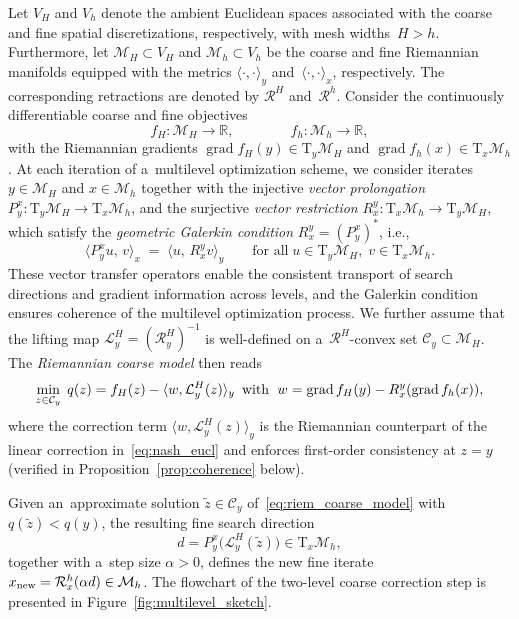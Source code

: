\documentclass[11pt,reqno]{amsart}
\theoremstyle{plain}
\newcommand\R{\mathbb R}
\DeclareMathOperator{\grad}{grad}
\newcommand\calC{\mathcal C}
\newcommand{\M}{\mathcal{M}}
\newcommand{\Tan}{\mathrm{T}}
\newcommand{\Ret}{\mathcal R}
\newcommand{\invRet}{\mathcal L}
\begin{document}
	Let $V_H$ and $V_h$ denote the ambient Euclidean spaces associated with the coarse and fine spatial discretizations, respectively, with mesh widths~$H>h$. Furthermore, let $\M_H\subset V_H$ and $\M_h\subset V_h$ be the coarse and fine Riemannian manifolds equipped with the metrics $\langle\cdot,\cdot\rangle_y$ and~$\langle\cdot,\cdot\rangle_x$, respectively. The corresponding retractions are denoted by $\Ret^H$ and~$\Ret^h$. Consider the continuously differentiable coarse and fine objectives
	\[
	f_H \colon \M_H \to  \R, \qquad\qquad f_h\colon\M_h \to \R,
	\]
	with the Riemannian gradients $\grad f_H(y)\in \Tan_{y} \M_H$ and $\grad f_h(x)\in\Tan_{x} \M_h$. At each
	iteration of a~multilevel optimization scheme, we consider iterates
	$y \in \M_H$ and $x \in \M_h$ together with the injective \emph{vector
		prolongation} $P_{y}^{x} \colon \Tan_{y} \M_H \to \Tan_{x} \M_h$,
	and the surjective \emph{vector restriction} $R_{x}^{y} \colon \Tan_{x} \M_h \to \Tan_{y} \M_H$, which satisfy the \emph{geometric Galerkin condition} $R_{x}^{y} = (P_{y}^{x})^\ast$, i.e.,\
	\begin{equation}\label{eq:riem_galerkin}
		\langle P_{y}^{x} u,\, v\rangle_{x} \;=\; \langle u,\, R_{x}^{y} v\rangle_{y}
		\qquad \text{for all}\;u \in \Tan_{y} \M_H,\;v\in \Tan_{x} \M_h.
	\end{equation}
	These vector transfer operators enable the consistent transport of search
	directions and gradient information across levels, and the Galerkin
	condition ensures coherence of the multilevel optimization process.
	We further assume that the lifting map $\invRet_{y}^H=(\Ret_{y}^H)^{-1}$ is
	well-defined on a~$\Ret^H$-convex set $\calC_{y}\subset \M_H$. The
	\emph{Riemannian coarse model} then reads
	\begin{equation} \label{eq:riem_coarse_model}
		\min\limits_{z \in \calC_{y}} \; q(z) = f_H(z) - \langle w, \invRet^H_{y}(z)\rangle_{y}
		\enskip \text{with }\; w = \grad f_H(y) - R_{x}^{y}(\grad f_h(x)),
	\end{equation}
	where the correction term $\langle w, \invRet^H_{y}(z)\rangle_{y}$ is the
	Riemannian counterpart of the linear correction in~\eqref{eq:nash_eucl}
	and enforces first-order consistency at $z = y$
	(verified in Proposition~\ref{prop:coherence} below).
	
	Given an~approximate solution $\tilde{z}\in\calC_y$ of~\eqref{eq:riem_coarse_model}
	with $q(\tilde{z})<q(y)$, the resulting fine search direction
	\begin{equation}\label{eq:fine_grid_update_dir}
		d = P_{y}^{x}\big(\invRet_{y}^H(\tilde{z})\big) \in \Tan_{x} \M_h,
	\end{equation}
	together with a~step size $\alpha>0$, defines the new fine iterate
	$x_{\rm new}=\Ret_{x}^h(\alpha d)\in\M_h$. The flowchart of the two-level coarse correction step is presented in Figure~\ref{fig:multilevel_sketch}.
	
\end{document}

